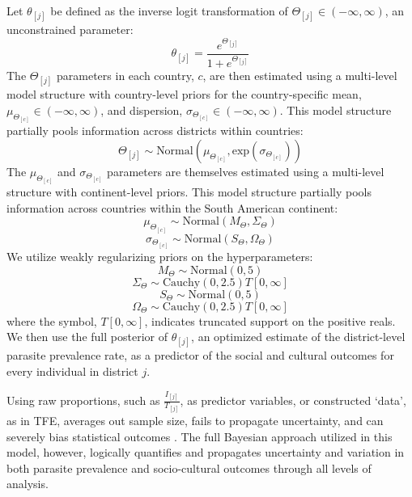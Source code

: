 \documentclass[12pt]{article}
\begin{document}
 Let $\theta_{[j]}$ be defined as the inverse logit transformation of $\Theta_{[j]}\in (-\infty,\infty)$, an unconstrained parameter:
\begin{equation}
\theta_{[j]} = \frac{e^{\Theta_{[j]}}}{1 + e^{\Theta_{[j]}}}
\end{equation}
The $\Theta_{[j]}$ parameters in each country, $c$, are then estimated using a multi-level model structure with country-level priors for the country-specific mean, $\mu_{\Theta_{[c]}}\in (-\infty,\infty)$, and dispersion, $\sigma_{\Theta_{[c]}} \in (-\infty,\infty)$. This model structure partially pools information across districts within countries:
\begin{equation}
\Theta_{[j]} \sim \text{Normal}(\mu_{\Theta_{[c]}},\text{exp}(\sigma_{\Theta_{[c]}}))
\end{equation}
The $\mu_{\Theta_{[c]}}$ and $\sigma_{\Theta_{[c]}}$ parameters are themselves estimated using a multi-level structure with continent-level priors. This model structure partially pools information across countries within the South American continent:
\begin{equation}
\mu_{\Theta_{[c]}} \sim \text{Normal}(M_{\Theta},\Sigma_{\Theta})
\end{equation}
\begin{equation}
\sigma_{\Theta_{[c]}} \sim \text{Normal}(S_{\Theta},\Omega_{\Theta})
\end{equation}
We utilize weakly regularizing priors on the hyperparameters:
\begin{equation}
M_{\Theta} \sim \text{Normal}(0,5)
\end{equation}
\begin{equation}
\Sigma_{\Theta} \sim \text{Cauchy}(0,2.5)T[0,\infty]
\end{equation}
\begin{equation}
S_{\Theta} \sim \text{Normal}(0,5)
\end{equation}
\begin{equation}
\Omega_{\Theta} \sim \text{Cauchy}(0,2.5)T[0,\infty]
\end{equation}
where the symbol, $T[0,\infty]$, indicates truncated support on the positive reals. We then use the full posterior of $\theta_{[j]}$, an optimized estimate of the district-level parasite prevalence rate, as a predictor of the social and cultural outcomes for every individual in district $j$. 

Using raw proportions, such as  $\frac{I_{[j]}}{T_{[j]}}$, as predictor variables, or constructed `data', as in TFE, averages out sample size, fails to propagate uncertainty, and can severely bias statistical outcomes \citep{McDonald2009}. The full Bayesian approach utilized in this model, however, logically quantifies and propagates uncertainty and variation in both parasite prevalence and socio-cultural outcomes through all levels of analysis.
\end{document}
